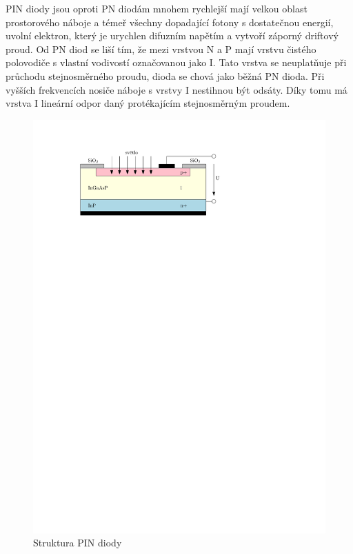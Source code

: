 PIN diody jsou oproti PN diodám mnohem rychlejší mají velkou oblast prostorového náboje a témeř všechny dopadající fotony s dostatečnou energií, uvolní elektron, který je urychlen difuzním napětím a vytvoří záporný driftový proud. Od PN diod se liší tím, že mezi vrstvou N a P mají vrstvu čistého polovodiče s vlastní vodivostí označovanou jako I. Tato vrstva se neuplatňuje při průchodu stejnosměrného proudu, dioda se chová jako běžná PN dioda. Při vyšších frekvencích nosiče náboje s vrstvy I nestihnou být odsáty. Díky tomu má vrstva I lineární odpor daný protékajícím stejnosměrným proudem.

\begin{figure}[H]
    \begin{center}
        \includegraphics[scale=1]{img/pin}
    \end{center}
    \caption{Struktura PIN diody}
\end{figure}

